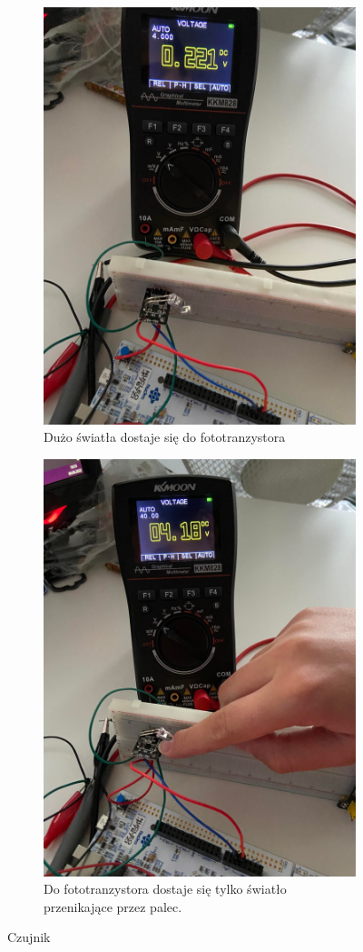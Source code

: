 \documentclass[11pt, a4paper]{article}
\begin{document}
\vspace{0.5cm}
\begin{figure}[h]
\centering
\begin{subfigure}{.5\textwidth}
  \centering
  \includegraphics[width=.6\linewidth]{fig/KY-039/działanie_ukladu/bez_palca.jpg}
  \caption{Dużo światła dostaje się do fototranzystora}
  \label{fig:sub1}
\end{subfigure}%
\begin{subfigure}{.5\textwidth}
  \centering
    \includegraphics[width=.6\textwidth]{fig/KY-039/działanie_ukladu/z_palcem.jpg}
      \caption{Do fototranzystora dostaje się tylko światło przenikające przez palec. }
  \label{zd}
\end{subfigure}
\caption{Czujnik}
\label{fig:test}
\end{figure}
\vspace{0.5cm}
\end{document}
